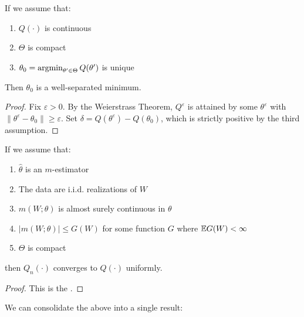 \documentclass[10pt]{article}
\begin{document}
\begin{theorem}
	If we assume that:
	\begin{enumerate}
		\item $Q(\cdot)$ is continuous
		\item $\Theta$ is compact
		\item $\theta_0 = \mathop{\rm argmin}_{\theta' \in \Theta} Q(\theta')$ is unique
	\end{enumerate}
	Then $\theta_0$ is a well-separated minimum.
\end{theorem}
\begin{proof}
	Fix $\varepsilon > 0$. By the Weierstrass Theorem, $Q^\varepsilon$ is attained by some $\theta^\varepsilon$ with $\|\theta^\varepsilon - \theta_0\| \ge \varepsilon$. Set $\delta = Q(\theta^\varepsilon) - Q(\theta_0)$, which is strictly positive by the third assumption.
\end{proof}


\begin{theorem}
	If we assume that:
	\begin{enumerate}
		\item $\hat{\theta}$ is an $m$-estimator
		\item The data are i.i.d. realizations of $W$
		\item $m(W;\theta)$ is almost surely continuous in $\theta$
		\item $|m(W;\theta)| \le G(W)$ for some function $G$ where $\mathbb{E} G(W) < \infty$
		\item $\Theta$ is compact 
	\end{enumerate}
	then $Q_n(\cdot)$ converges to $Q(\cdot)$ uniformly.
\end{theorem}
\begin{proof}
	This is the .
\end{proof}

\begin{remark}
	We can consolidate the above into a single result:
\end{remark}
\end{document}
